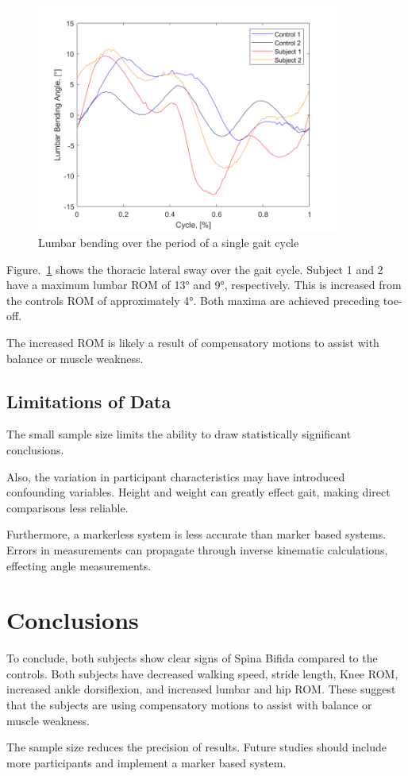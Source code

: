 \documentclass[conference]{IEEEtran}
\begin{document}
\begin{figure}[!ht]
\centering
\includegraphics[width=10cm]{LumbarBending.png}
\caption{Lumbar bending over the period of a single gait cycle}
\label{fig:LumbarBending}
\end{figure}

Figure.~\ref{fig:LumbarBending} shows the thoracic lateral sway over the gait cycle. Subject 1 and 2 have a maximum lumbar ROM of 13° and 9°, respectively. This is increased from the controls ROM of approximately 4°. Both maxima are achieved preceding toe-off.

The increased ROM is likely a result of compensatory motions to assist with balance or muscle weakness.

\subsection{Limitations of Data}

The small sample size limits the ability to draw statistically significant conclusions.

Also, the variation in participant characteristics may have introduced confounding variables. Height and weight can greatly effect gait, making direct comparisons less reliable.

Furthermore, a markerless system is less accurate than marker based systems. Errors in measurements can propagate through inverse kinematic calculations, effecting angle measurements.

\section{Conclusions}\label{conclusions}

To conclude, both subjects show clear signs of Spina Bifida compared to the controls. Both subjects have decreased walking speed, stride length, Knee ROM, increased ankle dorsiflexion, and increased lumbar and hip ROM. These suggest that the subjects are using compensatory motions to assist with balance or muscle weakness.

The sample size reduces the precision of results. Future studies should include more participants and implement a marker based system.




%  
\end{document}

